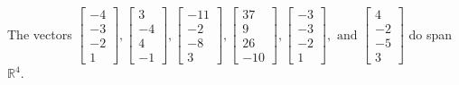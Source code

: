 \begin{exercise}
\begin{exerciseStatement}
  \end{exerciseStatement}
  \begin{exerciseAnswer}
   The vectors \(\left[\begin{array}{r}
-4 \\
-3 \\
-2 \\
1
\end{array}\right] , \left[\begin{array}{r}
3 \\
-4 \\
4 \\
-1
\end{array}\right] , \left[\begin{array}{r}
-11 \\
-2 \\
-8 \\
3
\end{array}\right] , \left[\begin{array}{r}
37 \\
9 \\
26 \\
-10
\end{array}\right] , \left[\begin{array}{r}
-3 \\
-3 \\
-2 \\
1
\end{array}\right] , \text{ and } \left[\begin{array}{r}
4 \\
-2 \\
-5 \\
3
\end{array}\right]\) 
  	 do  
	span \(\mathbb{R}^4\).
  


  \end{exerciseAnswer}
\end{exercise}